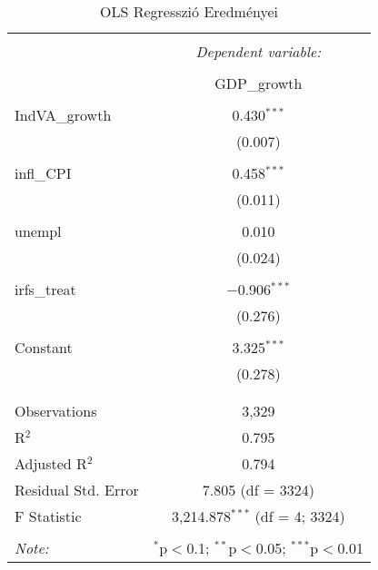 
\begin{table}[!htbp] \centering 
  \caption{OLS Regresszió Eredményei} 
  \label{} 
\begin{tabular}{@{\extracolsep{5pt}}lc} 
\\[-1.8ex]\hline 
\hline \\[-1.8ex] 
 & \multicolumn{1}{c}{\textit{Dependent variable:}} \\ 
\cline{2-2} 
\\[-1.8ex] & GDP\_growth \\ 
\hline \\[-1.8ex] 
 IndVA\_growth & 0.430$^{***}$ \\ 
  & (0.007) \\ 
  & \\ 
 infl\_CPI & 0.458$^{***}$ \\ 
  & (0.011) \\ 
  & \\ 
 unempl & 0.010 \\ 
  & (0.024) \\ 
  & \\ 
 irfs\_treat & $-$0.906$^{***}$ \\ 
  & (0.276) \\ 
  & \\ 
 Constant & 3.325$^{***}$ \\ 
  & (0.278) \\ 
  & \\ 
\hline \\[-1.8ex] 
Observations & 3,329 \\ 
R$^{2}$ & 0.795 \\ 
Adjusted R$^{2}$ & 0.794 \\ 
Residual Std. Error & 7.805 (df = 3324) \\ 
F Statistic & 3,214.878$^{***}$ (df = 4; 3324) \\ 
\hline 
\hline \\[-1.8ex] 
\textit{Note:}  & \multicolumn{1}{r}{$^{*}$p$<$0.1; $^{**}$p$<$0.05; $^{***}$p$<$0.01} \\ 
\end{tabular} 
\end{table} 
